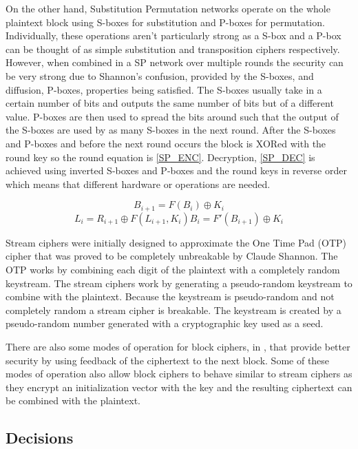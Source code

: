 \documentclass[12pt,twoside,a4paper]{report}
\begin{document}
	On the other hand, Substitution Permutation networks operate on the whole plaintext block using S-boxes for substitution and P-boxes for permutation. Individually, these operations aren't particularly strong as a S-box and a P-box can be thought of as simple substitution and transposition ciphers respectively. However, when combined in a SP network over multiple rounds the security can be very strong due to Shannon's confusion, provided by the S-boxes, and diffusion, P-boxes, properties being satisfied\cite{Shannon1949}. The S-boxes usually take in a certain number of bits and outputs the same number of bits but of a different value. P-boxes are then used to spread the bits around such that the output of the S-boxes are used by as many S-boxes in the next round. After the S-boxes and P-boxes and before the next round occurs the block is XORed with the round key so the round equation is \autoref{SP_ENC}. Decryption, \autoref{SP_DEC} is achieved using inverted S-boxes and P-boxes and the round keys in reverse order which means that different hardware or operations are needed.
    
	\begin{equation}
	\label{SP_ENC}
	B_{i+1} = F(B_i) \oplus K_i
	\end{equation}
	\begin{equation}
	\label{SP_DEC}
	L_i = R_{i+1} \oplus F(L_{i+1}, K_i)B_i = F'(B_{i+1}) \oplus K_i
	\end{equation}
    
	Stream ciphers were initially designed to approximate the One Time Pad (OTP) cipher that was proved to be completely unbreakable by Claude Shannon\cite{Shannon1949}. The OTP works by combining each digit of the plaintext with a completely random keystream. The stream ciphers work by generating a pseudo-random keystream to combine with the plaintext\cite{Robshaw1995}. Because the keystream is pseudo-random and not completely random a stream cipher is breakable. The keystream is created by a pseudo-random number generated with a cryptographic key used as a seed.   
    
	There are also some modes of operation for block ciphers, in \cite{Dworkin2001}, that provide better security by using feedback of the ciphertext to the next block. Some of these modes of operation also allow block ciphers to behave similar to stream ciphers as they encrypt an initialization vector with the key and the resulting ciphertext can be combined with the plaintext.
    
    \subsection{Decisions}
    \label{section:cryp_decisions}
    
\end{document}
